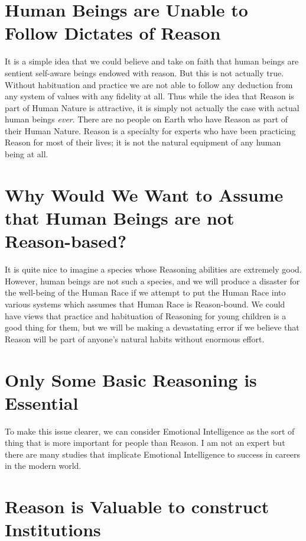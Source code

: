 \documentclass{amsart}
\begin{document}
\section{Human Beings are Unable to Follow Dictates of Reason}

It is a simple idea that we could believe and take on faith that human beings are sentient self-aware beings endowed with reason.  But this is not actually true.  Without habituation and practice we are not able to follow any deduction from any system of values with any fidelity at all. Thus while the idea that Reason is part of Human Nature is attractive, it is simply not actually the case with actual human beings {\em ever}.  There are no people on Earth who have Reason as part of their Human Nature.  Reason is a specialty for experts who have been practicing Reason for most of their lives; it is not the natural equipment of any human being at all.

\section{Why Would We Want to Assume that Human Beings are not Reason-based?}

It is quite nice to imagine a species whose Reasoning abilities are extremely good.  However, human beings are not such a species, and we will produce a disaster for the well-being of the Human Race if we attempt to put the Human Race into various systems which assumes that Human Race is Reason-bound.  We could have views that practice and habituation of Reasoning for young children is a good thing for them, but we will be making a devastating error if we believe that Reason will be part of anyone's natural habits without enormous effort.  

\section{Only Some Basic Reasoning is Essential}

To make this issue clearer, we can consider Emotional Intelligence as the sort of thing that is more important for people than Reason.  I am not an expert but there are many studies that implicate Emotional Intelligence to success in careers in the modern world.

\section{Reason is Valuable to construct Institutions}
\end{document}
